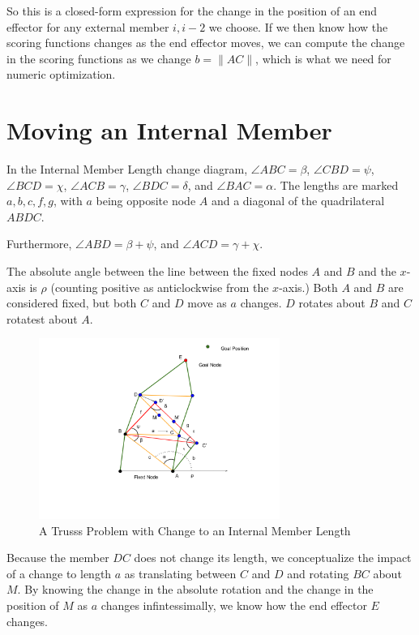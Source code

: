 \documentclass[11pt]{article}
\begin{document}
So this is a closed-form expression for the change in the position of an end effector for any external member $i,i-2$ we choose. If we then know how the
scoring functions changes as the end effector moves, we can compute the change in the scoring functions as we change $b = \| AC \|$, which is what
we need for numeric optimization.

\section{Moving an Internal Member}


In the Internal Member Length change diagram, $\angle ABC = \beta $, $\angle CBD = \psi$, $\angle BCD = \chi$,
$\angle ACB = \gamma$, $\angle BDC = \delta$, and $\angle BAC = \alpha$. The lengths are marked $a,b,c,f,g$, with $a$ being opposite node $A$ and a diagonal
of the quadrilateral $ABDC$.




Furthermore, $\angle ABD = \beta + \psi$, and $\angle ACD = \gamma + \chi$.

The absolute angle between the line between the fixed nodes $A$ and $B$ and the $x$-axis is $\rho$ (counting positive as anticlockwise from the $x$-axis.)
Both $A$ and $B$ are considered fixed, but both $C$ and $D$ move as $a$ changes. $D$ rotates about $B$ and $C$ rotatest about $A$.

\begin{figure}
  \centering
  \includegraphics[width=0.7\textwidth]{Internal_angle_change.png}
  \caption{A Trusss Problem with Change to an Internal Member Length}  
\end{figure}


Because the member $DC$ does not change its length, we conceptualize the impact of a change to length $a$ as translating  between $C$ and $D$ and
rotating $BC$ about $M$. By knowing the change in the absolute rotation and the change in the position of $M$ as $a$ changes infintessimally, we know how the
end effector $E$ changes.
\end{document}
